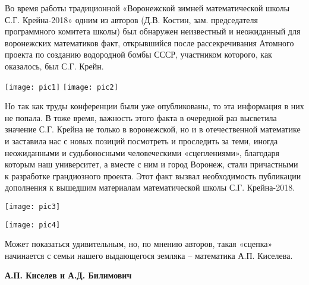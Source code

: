 
\vzmscaption

Во время работы традиционной «Воронежской зимней математической школы С.Г. Крейна-2018» одним из авторов (Д.В. Костин, зам. председателя программного комитета школы) был обнаружен неизвестный и неожиданный для воронежских математиков факт, открывшийся после рассекречивания Атомного проекта по созданию водородной бомбы СССР, участником которого, как оказалось, был С.Г. Крейн.

\begin{center}
\texttt{[image: pic1]}
\texttt{[image: pic2]}
\end{center}

Но так как труды конференции были уже опубликованы, то эта информация в них не попала. В тоже время, важность этого факта в очередной раз высветила значение С.Г. Крейна не только в воронежской, но и в отечественной математике и заставила нас с новых позиций посмотреть и проследить за теми, иногда неожиданными и судьбоносными человеческими «сцеплениями», благодаря которым наш университет, а вместе с ним и город Воронеж, стали причастными к разработке грандиозного проекта. Этот факт вызвал необходимость публикации дополнения к вышедшим материалам математической школы С.Г. Крейна-2018.

\texttt{[image: pic3]}

\texttt{[image: pic4]}

Может показаться удивительным, но, по мнению авторов, такая «сцепка» начинается с семьи нашего выдающегося земляка – математика А.П. Киселева.

\begin{center}
{\bf А.П. Киселев и А.Д. Билимович}
\end{center}


